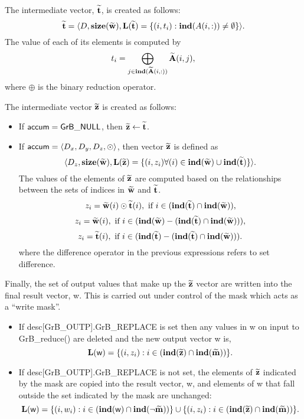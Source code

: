 The intermediate vector, ${\bf \widetilde{t}}$, is created as follows:
\[ 
{\bf \widetilde{t}} = \langle
D, \bold{size}({\bf \widetilde{w}}),
\bold{L}({\bf \widetilde{t}}) =
\{(i,t_i) : \bold{ind}(A(i,:)) \neq \emptyset   \} \rangle. 
\]
The value of each of its elements is computed by
\[
	t_i = \bigoplus_{j \in \bold{ind}({\bf \widetilde{A}}(i,:))} {\bf \widetilde{A}}(i,j), 
\]
where $\oplus$ is the binary reduction operator.

The intermediate vector ${\bf \widetilde{z}}$ is created as follows:
\begin{itemize}
    \item If ${\sf accum} = {\sf GrB\_NULL}$, then ${\bf \widetilde{z}} \leftarrow {\bf \widetilde{t}}$.

    \item If ${\sf accum} = \langle D_x, D_y, D_z, \odot \rangle$, then vector ${\bf \widetilde{z}}$ is defined as 
        \[ \langle D_z, \bold{size}({\bf \widetilde{w}}), \bold{L}({\bf \widetilde{z}})
		= \{(i,z_{i})  \forall (i) \in \bold{ind}({\bf \widetilde{w}}) \cup 
        \bold{ind}({\bf \widetilde{t}}) \} \rangle.\]
    The values of the elements of ${\bf \widetilde{z}}$ are computed based on the relationships between the sets of indices in ${\bf \widetilde{w}}$ and ${\bf \widetilde{t}}$.
\[
z_{i} = {\bf \widetilde{w}}(i) \odot {\bf \widetilde{t}}(i), \mbox{~if~}  i \in  (\bold{ind}({\bf \widetilde{t}}) \cap \bold{ind}({\bf \widetilde{w}})),
\]
\[
z_{i} = {\bf \widetilde{w}}(i), \mbox{~if~}  i \in  (\bold{ind}({\bf \widetilde{w}}) - (\bold{ind}({\bf \widetilde{t}}) \cap \bold{ind}({\bf \widetilde{w}}))),
\]
\[
z_{i} = {\bf \widetilde{t}}(i), \mbox{~if~}  i \in  (\bold{ind}({\bf \widetilde{t}}) - (\bold{ind}({\bf \widetilde{t}}) \cap \bold{ind}({\bf \widetilde{w}}))).
\]
where the difference operator in the previous expressions refers to set difference.
\end{itemize}

Finally, the set of output values that make up the ${\bf \widetilde{z}}$ 
vector are written into the final result vector, {\sf w}. 
This is carried out under control of the mask which acts as a ``write mask''.
\begin{itemize}
\item If {\sf desc[GrB\_OUTP].GrB\_REPLACE} is set then any values in {\sf w} 
on input to {\sf GrB\_reduce()} are deleted and the new output vector {\sf w} is,
\[ \bold{L}({\sf w}) = \{(i,z_{i}) : i \in (\bold{ind}({\bf \widetilde{z}}) 
\cap \bold{ind}({\bf \widetilde{m}})) \}. \]

\item If {\sf desc[GrB\_OUTP].GrB\_REPLACE} is not set, the elements of 
${\bf \widetilde{z}}$ indicated by 
the mask are copied into the result vector, {\sf w}, and elements of 
{\sf w} that fall outside the set indicated by the mask are unchanged:
\[ \bold{L}({\sf w}) = \{(i,w_{i}) : i \in (\bold{ind}({\sf w}) 
\cap \bold{ind}(\neg {\bf \widetilde{m}})) \} \cup \{(i,z_{i}) : i \in 
(\bold{ind}({\bf \widetilde{z}}) \cap \bold{ind}({\bf \widetilde{m}})) \}. \]
\end{itemize}

